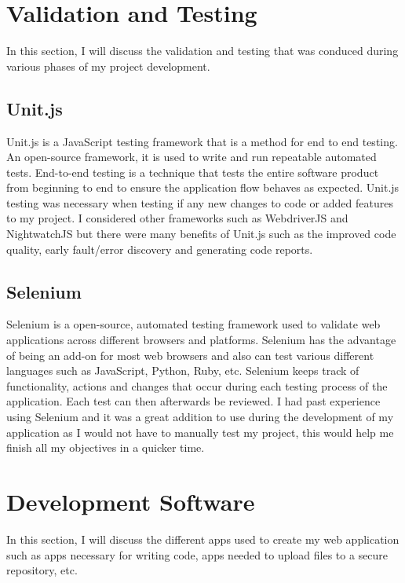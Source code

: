 \section{Validation and Testing}

In this section, I will discuss the validation and testing that was conduced during various phases of my project development.

\subsection{Unit.js}

Unit.js is a JavaScript testing framework that is a method for end to end testing. An open-source framework, it is used to write and run repeatable automated tests. End-to-end testing is a technique that tests the entire software product from beginning to end to ensure the application flow behaves as expected. Unit.js testing was necessary when testing if any new changes to code or added features to my project. I considered other frameworks such as WebdriverJS and NightwatchJS but there were many benefits of Unit.js such as the improved code quality, early fault/error discovery and generating code reports.

\subsection{Selenium}

Selenium is a open-source, automated testing framework used to validate web applications across different browsers and platforms. Selenium has the advantage of being an add-on for most web browsers and also can test various different languages such as JavaScript, Python, Ruby, etc. Selenium keeps track of functionality, actions and changes that occur during each testing process of the application. Each test can then afterwards be reviewed. I had past experience using Selenium and it was a great addition to use during the development of my application as I would not have to manually test my project, this would help me finish all my objectives in a quicker time.

\section{Development Software}

In this section, I will discuss the different apps used to create my web application such as apps necessary for writing code, apps needed to upload files to a secure repository, etc.

